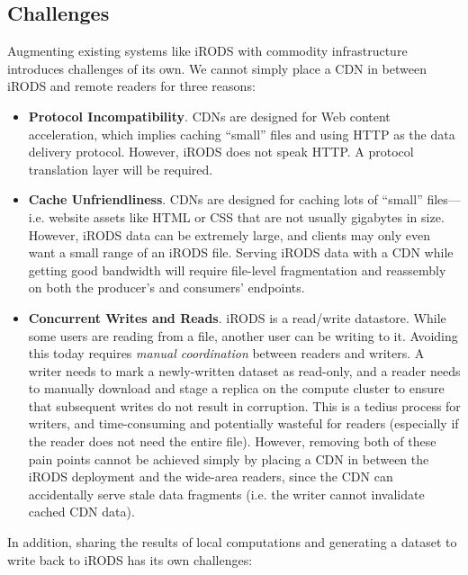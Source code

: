 \subsection{Challenges}

Augmenting existing systems like iRODS
with commodity infrastructure introduces challenges of
its own.  We cannot simply place a CDN in between iRODS and remote readers for
three reasons:

\begin{itemize}
\item \textbf{Protocol Incompatibility}.  CDNs are designed for Web content
acceleration, which implies caching ``small'' files and
using HTTP as the data delivery protocol.  However,
iRODS does not speak HTTP.  A protocol translation layer will be required.
\item \textbf{Cache Unfriendliness}.  CDNs are designed for caching lots of
``small'' files---i.e. website assets like HTML or CSS that are not usually
gigabytes in size.  However, iRODS data can be extremely large, and clients may
only even want a small range of an iRODS file.  Serving iRODS data with a CDN
while getting good bandwidth will require file-level fragmentation and reassembly
on both the producer's and consumers' endpoints.
\item \textbf{Concurrent Writes and Reads}.  iRODS is a read/write datastore.
While some users are reading from a file, another user can be writing to it.
Avoiding this today requires \emph{manual coordination} between readers and
writers.  A writer needs to mark a newly-written dataset as read-only, and a
reader needs to manually download and stage a replica on the compute cluster to
ensure that subsequent writes do not result in corruption.  This is a tedius
process for writers, and time-consuming and potentially wasteful for readers
(especially if the reader does not need the entire file).  However, removing both of
these pain points cannot be achieved simply by placing a CDN in between the
iRODS deployment and the wide-area readers, since the CDN can accidentally serve
stale data fragments (i.e. the writer cannot invalidate cached CDN data).
\end{itemize}

In addition, sharing the results of local computations and generating a
dataset to write back to iRODS has its own challenges:

